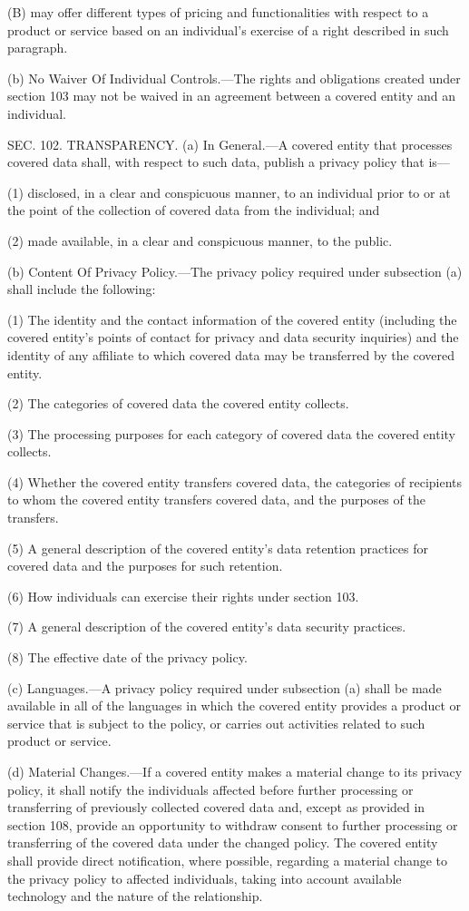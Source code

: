 (B) may offer different types of pricing and functionalities with respect to a product or service based on an individual's exercise of a right described in such paragraph.

(b) No Waiver Of Individual Controls.—The rights and obligations created under section 103 may not be waived in an agreement between a covered entity and an individual.


SEC. 102. TRANSPARENCY.
(a) In General.—A covered entity that processes covered data shall, with respect to such data, publish a privacy policy that is—

(1) disclosed, in a clear and conspicuous manner, to an individual prior to or at the point of the collection of covered data from the individual; and

(2) made available, in a clear and conspicuous manner, to the public.

(b) Content Of Privacy Policy.—The privacy policy required under subsection (a) shall include the following:

(1) The identity and the contact information of the covered entity (including the covered entity's points of contact for privacy and data security inquiries) and the identity of any affiliate to which covered data may be transferred by the covered entity.

(2) The categories of covered data the covered entity collects.

(3) The processing purposes for each category of covered data the covered entity collects.

(4) Whether the covered entity transfers covered data, the categories of recipients to whom the covered entity transfers covered data, and the purposes of the transfers.

(5) A general description of the covered entity’s data retention practices for covered data and the purposes for such retention.

(6) How individuals can exercise their rights under section 103.

(7) A general description of the covered entity’s data security practices.

(8) The effective date of the privacy policy.

(c) Languages.—A privacy policy required under subsection (a) shall be made available in all of the languages in which the covered entity provides a product or service that is subject to the policy, or carries out activities related to such product or service.

(d) Material Changes.—If a covered entity makes a material change to its privacy policy, it shall notify the individuals affected before further processing or transferring of previously collected covered data and, except as provided in section 108, provide an opportunity to withdraw consent to further processing or transferring of the covered data under the changed policy. The covered entity shall provide direct notification, where possible, regarding a material change to the privacy policy to affected individuals, taking into account available technology and the nature of the relationship.

